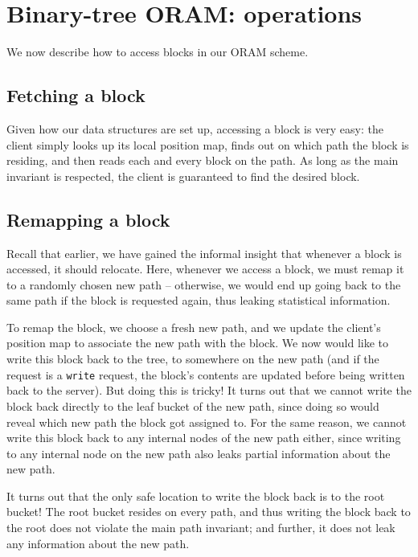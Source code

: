 \section{Binary-tree ORAM: operations}\label{operations}

We now describe how to access blocks in our ORAM scheme.

\subsection{Fetching a block}\label{fetching-a-block.}

Given how our data structures are set up, accessing a block is very
easy: the client simply looks up its local position map, finds out on
which path the block is residing, and then reads each and every block on
the path. As long as the main invariant is respected, the client is
guaranteed to find the desired block.

\subsection{Remapping a block}\label{remapping-a-block.}

Recall that earlier, we have gained the informal insight that whenever a
block is accessed, it should relocate. Here, whenever we access a block,
we must remap it to a randomly chosen new path -- otherwise, we would
end up going back to the same path if the block is requested again, thus
leaking statistical information.

To remap the block, we choose a fresh new path, and we update the
client's position map to associate the new path with the block. We now
would like to write this block back to the tree, to somewhere on the new
path (and if the request is a \texttt{write} request, the block's
contents are updated before being written back to the server). But doing
this is tricky! It turns out that we cannot write the block back
directly to the leaf bucket of the new path, since doing so would reveal
which new path the block got assigned to. For the same reason, we cannot
write this block back to any internal nodes of the new path either,
since writing to any internal node on the new path also leaks partial
information about the new path.

It turns out that the only safe location to write the block back is to
the root bucket! The root bucket resides on every path, and thus writing
the block back to the root does not violate the main path invariant; and
further, it does not leak any information about the new path.

